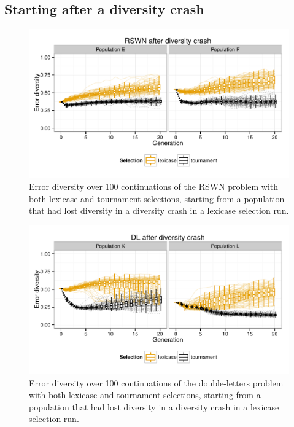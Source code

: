 \documentclass{sig-alternate-05-2015}
\begin{document}
\subsection{Starting after a diversity crash}
\label{sec:crashDiversityResults}

\begin{figure}
	\includegraphics{../figures/RSWN_diversity_crash}
	\vspace{-1 cm}
	\caption{Error diversity over 100 continuations of the RSWN problem with both lexicase and tournament selections, starting from a population that had lost diversity in a diversity crash in a lexicase selection run.}
	\label{fig:RSWNdiversityCrash}
\end{figure}

\begin{figure}
	\includegraphics{../figures/DL_diversity_crash}
	\vspace{-1 cm}
	\caption{Error diversity over 100 continuations of the double-letters problem with both lexicase and tournament selections, starting from a population that had lost diversity in a diversity crash in a lexicase selection run.}
	\label{fig:DLdiversityCrash}
\end{figure}
\end{document}
